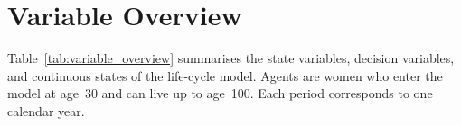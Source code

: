 %
%         
%

\providecommand{\figurenotes}[1]{%
  \par\vspace{0.4em}%
  \begin{minipage}{\linewidth}%
    \footnotesize\textit{Notes:}\ #1%
  \end{minipage}%
}


\section{Variable Overview}
\label{sec:variable_overview}

Table~\ref{tab:variable_overview} summarises the state variables, decision
variables, and continuous states of the life-cycle model.  Agents are women
who enter the model at age~30 and can live up to age~100.  Each period
corresponds to one calendar year.

